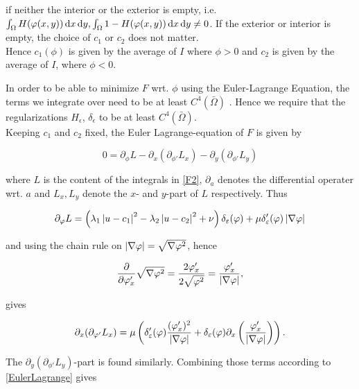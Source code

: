 if neither the interior or the exterior is empty, i.e. $\int_\Omega H(\varphi(x,y))\,{\rm d} x \,{\rm d} y, \int_\Omega 1-H(\varphi(x,y))\,{\rm d} x \,{\rm d} y\neq 0$. If the exterior or interior is empty, the choice of $c_1$ or $c_2$ does not matter. \\
Hence $c_1(\phi)$ is given by the average of $I$ where $\phi >0$ and $c_2$ is given by the average of $I$, where $\phi<0$.

In order to be able to minimize $F$ wrt. $\phi$ using the Euler-Lagrange Equation, the terms we integrate over need to be at least $C^4(\bar{\Omega})$ \cite{fox.50}. Hence we require that the regularizations $H_\epsilon$, $\delta_\epsilon$ to be at least $C^4(\bar{\Omega})$.\\
Keeping $c_1$ and $c_2$ fixed, the Euler Lagrange-equation of $F$ is given by

\begin{equation}\label{EulerLagrange}
  0 = \partial_\phi L - \partial_x (\partial_{\phi'}L_x)-\partial_y(\partial_{\phi'} L_y)
\end{equation}

where $L$ is the content of the integrals in \eqref{F2}, $\partial_a$ denotes the differential operater wrt. $a$ and $L_x,L_y$ denote the $x$- and $y$-part of $L$ respectively. Thus

\begin{equation}
  \partial_\varphi L = \left(\lambda_1\left| {u-c_1} \right|^2 - \lambda_2\left| {u-c_2} \right|^2 + \nu \right)\delta_\varepsilon(\varphi) + \mu\delta_\varepsilon'(\varphi)\left| {\nabla\varphi} \right|
\end{equation}

and using the chain rule on $\left| {\nabla\varphi} \right| = \sqrt{\nabla\varphi^2}$, hence 

\begin{equation}
  \frac{\partial}{\partial \varphi_x'}\sqrt{\nabla\varphi^2}=\frac{2\varphi_x'}{2\sqrt{\varphi^2}}=\frac{\varphi_x'}{\left| {\nabla\varphi} \right|},
\end{equation}

gives

\begin{equation}
  \partial_x (\partial_{\varphi'}L_x) = \mu \left(\delta_\varepsilon'(\varphi)\frac{(\varphi_x')^2}{\left| {\nabla \varphi} \right|} + \delta_\varepsilon(\varphi)\partial_x\left(\frac{\varphi_x'}{\left| {\nabla\varphi} \right|}\right)\right).
\end{equation}

The $\partial_y (\partial_{\phi'}L_y)$-part is found similarly. Combining those terms according to \eqref{EulerLagrange} gives

